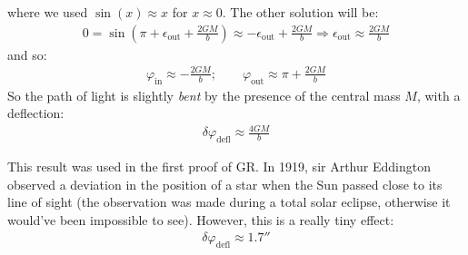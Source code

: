 \documentclass[../template.tex]{subfiles}
\begin{document}
where we used $\sin(x) \approx x$ for $x \approx 0$. The other solution will be:
\begin{align*}
    0 = \sin(\pi + \epsilon_{\mathrm{out} } + \frac{2GM}{b} ) \approx -\epsilon_{\mathrm{out} } + \frac{2GM}{b} \Rightarrow \epsilon_{\mathrm{out} }  \approx \frac{2GM}{b} 
\end{align*}  
and so:
\begin{align*}
    \varphi_{\mathrm{in} } \approx -\frac{2GM}{b}; \qquad \varphi_{\mathrm{out} } \approx \pi + \frac{2GM}{b}  
\end{align*}
So the path of light is slightly \textit{bent} by the presence of the central mass $M$, with a deflection:
\begin{align*}
    \delta\varphi_{\mathrm{defl} } \approx \frac{4GM}{b} 
\end{align*}

This result was used in the first proof of GR. In 1919, sir Arthur Eddington observed a deviation in the position of a star when the Sun passed close to its line of sight (the observation was made during a total solar eclipse, otherwise it would've been impossible to see). However, this is a really tiny effect:
\begin{align*}
    \delta \varphi_{\mathrm{defl} } \approx 1.7''
\end{align*}
\end{document}
